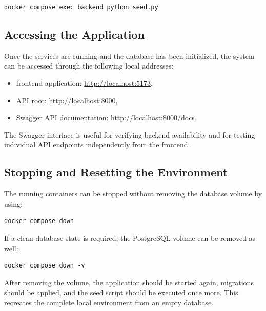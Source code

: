 \begin{verbatim}
docker compose exec backend python seed.py
\end{verbatim}

\subsection{Accessing the Application}

Once the services are running and the database has been initialized, the system can be accessed through the following local addresses:

\begin{itemize}
    \item frontend application: \url{http://localhost:5173},
    \item API root: \url{http://localhost:8000},
    \item Swagger API documentation: \url{http://localhost:8000/docs}.
\end{itemize}

The Swagger interface is useful for verifying backend availability and for testing individual API endpoints independently from the frontend.

\subsection{Stopping and Resetting the Environment}

The running containers can be stopped without removing the database volume by using:

\begin{verbatim}
docker compose down
\end{verbatim}

If a clean database state is required, the PostgreSQL volume can be removed as well:

\begin{verbatim}
docker compose down -v
\end{verbatim}

After removing the volume, the application should be started again, migrations should be applied, and the seed script should be executed once more. This recreates the complete local environment from an empty database.
